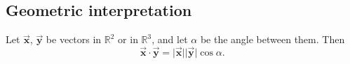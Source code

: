 \documentclass[12pt]{article}
\theoremstyle{remark}
\let\oldvec = \vec
\renewcommand{\vec}[1]{\oldvec{\mathbf{#1}}}
\numberwithin{equation}{section}
\begin{document}
\subsection{Geometric interpretation}%
\label{sub:Geometric interpretation}

\begin{important}
	Let $ \vec{x} $, $ \vec{y} $ be vectors in $ \mathbb{R}^{2} $ or in $ \mathbb{R}^{3} $, and let $ \alpha $ be the angle between them. Then
	\begin{equation}
		\vec{x} \cdot \vec{y} = \lvert \vec{x} \rvert \lvert \vec{y} \rvert \cos{\alpha}.
	\end{equation}
	
\end{important}
\end{document}
